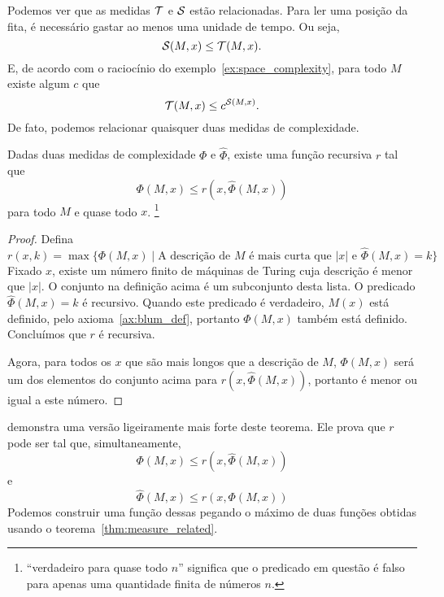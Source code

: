 Podemos ver que as medidas ${\mathcal{T}}$ e ${\mathcal{S}}$ estão relacionadas.
Para ler uma posição da fita,
é necessário gastar ao menos uma unidade de tempo.
Ou seja,
\begin{equation*}
    {\mathcal{S}}(M, x) \leq {\mathcal{T}}(M, x).
\end{equation*}
E, de acordo com o raciocínio do exemplo~\ref{ex:space_complexity},
para todo $M$ existe algum $c$ que
\begin{equation*}
    {\mathcal{T}}(M, x) \leq c^{{\mathcal{S}}(M, x)}.
\end{equation*}
De fato, podemos relacionar quaisquer duas medidas de complexidade.

\begin{theorem}
    \label{thm:measure_related}
    Dadas duas medidas de complexidade $\Phi$ e $\hat \Phi$,
    existe uma função recursiva $r$ tal que
    \begin{equation*}
        \Phi(M, x) \leq r( x, \hat \Phi(M, x))
    \end{equation*}
    para todo $M$ e quase todo $x$.%
    \footnote{
        ``verdadeiro para quase todo $n$''
        significa que o predicado em questão
        é falso para apenas uma quantidade finita de números $n$.
    }
\end{theorem}

\begin{proof}
    Defina
    \begin{equation*}
        r( x, k ) = \max \{ \Phi(M, x) \mid
            \text{A descrição de $M$ é mais curta que $|x|$}
            \text{ e }
            \hat \Phi(M, x) = k
        \}
    \end{equation*}
    Fixado $x$, existe um número finito de máquinas de Turing
    cuja descrição é menor que $|x|$.
    O conjunto na definição acima é um subconjunto desta lista.
    O predicado $\hat \Phi(M, x) = k$ é recursivo.
    Quando este predicado é verdadeiro,
    $M(x)$ está definido, pelo axioma~\ref{ax:blum_def},
    portanto $\Phi(M, x)$ também está definido.
    Concluímos que $r$ é recursiva.

    Agora, para todos os $x$ que são mais longos que a descrição de $M$,
    $\Phi(M, x)$ será um dos elementos do conjunto acima
    para $r( x, \hat \Phi(M, x))$,
    portanto é menor ou igual a este número.
\end{proof}

 demonstra uma versão ligeiramente mais forte
deste teorema.
Ele prova que $r$ pode ser tal que,
simultaneamente,
\begin{equation*}
    \Phi(M, x) \leq r( x, \hat \Phi(M, x))
\end{equation*}
e
\begin{equation*}
    \hat \Phi(M, x) \leq r( x, \Phi(M, x))
\end{equation*}
Podemos construir uma função dessas
pegando o máximo de duas funções obtidas
usando o teorema~\ref{thm:measure_related}.

